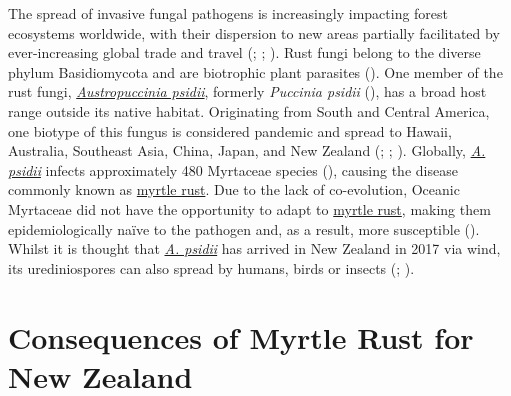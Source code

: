 \documentclass[
]{scrreprt}
\begin{document}
The spread of invasive fungal pathogens is increasingly impacting forest
ecosystems worldwide, with their dispersion to new areas partially
facilitated by ever-increasing global trade and travel
(;
;
).
Rust fungi belong to the diverse phylum Basidiomycota and are biotrophic
plant parasites (). One
member of the rust fungi, \hyperref[acronyms_AP]{\emph{Austropuccinia
psidii}}, formerly \emph{Puccinia psidii}
(), has a
broad host range outside its native habitat. Originating from South and
Central America, one biotype of this fungus is considered pandemic and
spread to Hawaii, Australia, Southeast Asia, China, Japan, and New
Zealand (; ; ). Globally, \hyperref[acronyms_AP]{\emph{A. psidii}} infects
approximately 480 Myrtaceae species
(), causing the disease commonly known as
\hyperref[acronyms_MR]{myrtle rust}. Due to the lack of co-evolution,
Oceanic Myrtaceae did not have the opportunity to adapt to
\hyperref[acronyms_MR]{myrtle rust}, making them epidemiologically naïve
to the pathogen and, as a result, more susceptible
(). Whilst it is
thought that \hyperref[acronyms_AP]{\emph{A. psidii}} has arrived in New
Zealand in 2017 via wind, its urediniospores can also spread by humans,
birds or insects (; ).

\section{Consequences of Myrtle Rust for New
Zealand}\label{consequences-of-myrtle-rust-for-new-zealand}
\end{document}
